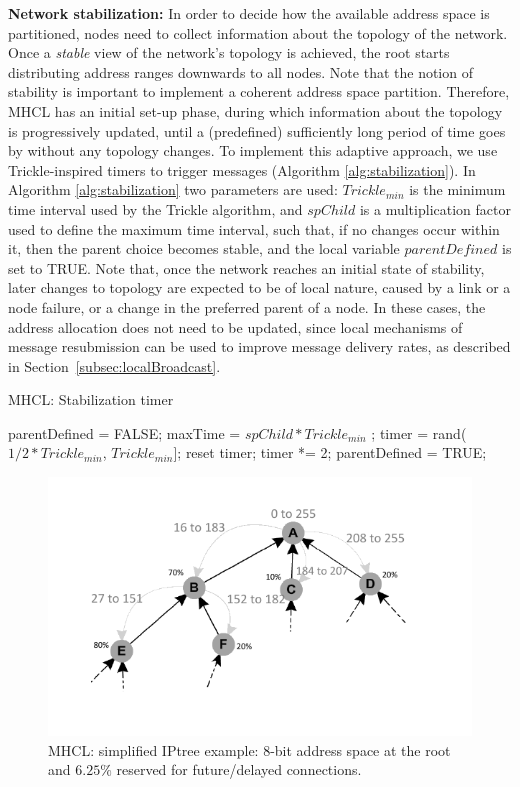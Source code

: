 \textbf{Network stabilization:} In order to decide how the available address space is partitioned, nodes need to collect information about the topology of the network. Once a \textit{stable} view of the network's topology is achieved, the root starts distributing address ranges downwards to all nodes. Note that the notion of stability is important to implement a coherent address space partition. Therefore, MHCL has an initial set-up phase, during which information about the topology is progressively updated, until a (predefined) sufficiently long period of time goes by without any topology changes. To implement this adaptive approach, we use Trickle-inspired timers to trigger messages (Algorithm \ref{alg:stabilization}). In Algorithm \ref{alg:stabilization} two parameters are used: $Trickle_{min}$ is the minimum time interval used by the Trickle algorithm, and $spChild$ is a multiplication factor used to define the maximum time interval, such that, if no changes occur within it, then the parent choice becomes
  stable, and the local variable $parentDefined$ is set to TRUE.  Note that, once the network reaches an initial state of stability, later changes to topology are expected to be of local nature, caused by a link or a node failure, or a change in the preferred parent of a node. In these cases, the address allocation does not need to be updated, since local mechanisms of message resubmission can be used to improve message delivery rates, as described in Section~\ref{subsec:localBroadcast}.

\begin{algorithm}[h]
\caption{MHCL: Stabilization timer}\label{alg:stabilization}
\begin{algorithmic}[1]
\State parentDefined = FALSE;
\State maxTime = $spChild * Trickle_{min}$ ;
\State timer = rand($1/2 * Trickle_{min}$, $Trickle_{min}$]; 
			\State reset timer;
		\Else	
			\State timer *= 2; 
		\Else
			\State parentDefined = TRUE;
		\EndIf
		\EndIf
	\EndIf	
\EndWhile
\end{algorithmic}
\end{algorithm}

\begin{figure}
\centering
\includegraphics[width=.7\columnwidth]{Images/mhcl-a.pdf}
\caption{MHCL: simplified IPtree example: 8-bit address space at the root and $6.25\%$ reserved for future/delayed connections.}\label{fig:addrPartitionAggregate}
\end{figure}

